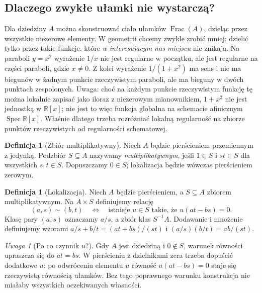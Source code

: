 \documentclass[11pt,a4paper,openany]{report}
\numberwithin{equation}{section}
\theoremstyle{plain}
\theoremstyle{definition}
\newtheorem{definicja}[twierdzenie]{Definicja}
\theoremstyle{remark}
\newtheorem{uwaga}[twierdzenie]{Uwaga}
\newcommand{\R}{\mathbb R}
\newcommand{\Frac}{\operatorname{Frac}}
\begin{document}
\subsection{Dlaczego zwykłe ułamki nie wystarczą?}
Dla dziedziny $A$ można skonstruować ciało ułamków $\Frac(A)$,
dzieląc przez wszystkie niezerowe elementy. W geometrii chcemy zwykle
zrobić mniej: dzielić tylko przez takie funkcje, które \emph{w
interesującym nas miejscu} nie znikają. Na paraboli $y=x^2$
wyrażenie $1/x$ nie jest regularne w początku, ale jest regularne
na części paraboli, gdzie $x\ne0$. Z kolei wyrażenie $1/(1+x^2)$ ma sens i nie ma biegunów
w żadnym punkcie rzeczywistym paraboli, ale ma bieguny w dwóch
punktach zespolonych. Uwaga: choć na każdym punkcie
rzeczywistym funkcję tę można lokalnie zapisać jako iloraz
z niezerowym mianownikiem, $1+x^2$ nie jest jednostką w
$\R[x]$; nie jest to więc funkcja globalna na schemacie
afinicznym $\operatorname{Spec}\R[x]$. Właśnie dlatego
trzeba rozróżniać lokalną regularność na zbiorze punktów
rzeczywistych od regularności schematowej.

\begin{definicja}[Zbiór multiplikatywny]
Niech $A$ będzie pierścieniem przemiennym z jedynką.
Podzbiór $S\subseteq A$ nazywamy \emph{multiplikatywnym},
jeśli $1\in S$ i $st\in S$ dla wszystkich $s,t\in S$.
Dopuszczamy $0\in S$; lokalizacja będzie wówczas pierścieniem zerowym.
\end{definicja}

\begin{definicja}[Lokalizacja]
\label{def:loc}
Niech $A$ będzie pierścieniem, a $S\subseteq A$ zbiorem
multiplikatywnym. Na $A\times S$ definiujemy relację
\[
(a,s)\sim(b,t) \quad\Longleftrightarrow\quad
\text{istnieje }u\in S\text{ takie, że }u(at-bs)=0.
\]
Klasę pary $(a,s)$ oznaczamy $a/s$, a zbiór klas $S^{-1}A$.
Dodawanie i mnożenie definiujemy wzorami
$a/s+b/t=(at+bs)/(st)$ i $(a/s)(b/t)=ab/(st)$.
\end{definicja}

\begin{uwaga}[Po co czynnik $u$?]
Gdy $A$ jest dziedziną i $0\notin S$, warunek równości
upraszcza się do $at=bs$. W pierścieniu z dzielnikami zera
trzeba dopuścić dodatkowe $u$: po odwróceniu elementu $u$
równość $u(at-bs)=0$ staje się rzeczywistą równością
ułamków. Bez tego poprawnego warunku konstrukcja nie
miałaby wszystkich oczekiwanych własności.
\end{uwaga}
\end{document}
